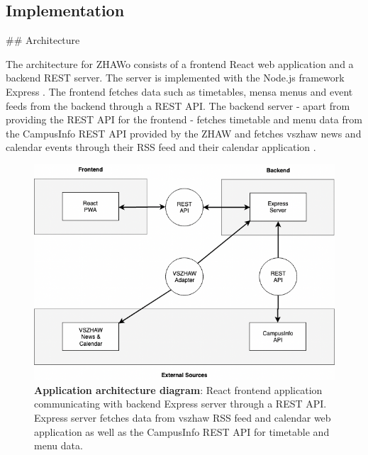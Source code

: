 \begin{markdown}
\section{Implementation} \label{implementation}

## Architecture

The architecture for ZHAWo consists of a frontend React web application \cite{React} and a backend REST server. The server is implemented with the Node.js \cite{Node} framework Express \cite{Express}. The frontend fetches data such as timetables, mensa menus and event feeds from the backend through a REST API. The backend server - apart from providing the REST API for the frontend - fetches timetable and menu data from the CampusInfo REST API provided by the ZHAW and fetches vszhaw news and calendar events through their RSS feed \cite{VszhawNews} and their calendar application \cite{VszhawCalendar}.

\bigskip
\bigskip

\begin{figure}[H]
  \includegraphics[width=14cm, center]{../../diagrams/applicationArchitecture.png}
  \captionsetup{width=13.5cm}
  \caption[Application architecture diagram]{\textbf{Application architecture diagram}: React frontend application communicating with backend Express server through a REST API. Express server fetches data from vszhaw RSS feed and calendar web application as well as the CampusInfo REST API for timetable and menu data.}
\end{figure}

\newpage


\end{markdown}
